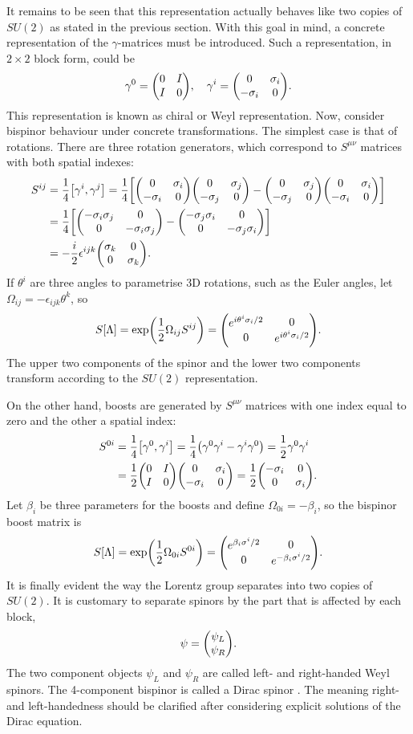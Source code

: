 It remains to be seen that this representation actually behaves like two copies of $SU(2)$ as stated in the previous section. With this goal in mind, a concrete representation of the $\gamma$-matrices must be introduced. Such a representation, in $2\times 2$ block form, could be
$$\gamma^0 = \mqty(\admat[0]{I,I}), \quad \gamma^{i} = \mqty(\admat[0]{\sigma_i,-\sigma_i}).$$ This representation is known as chiral or Weyl representation. Now, consider bispinor behaviour under concrete transformations. The simplest case is that of rotations. There are three rotation generators, which correspond to $S^{\mu\nu}$ matrices with both spatial indexes:
\begin{align*}
    S^{ij} &= \frac{1}{4}\comm{\gamma^{i}}{\gamma^{j}} = \frac{1}{4}\qty[\mqty(\admat[0]{\sigma_{i},-\sigma_i})\mqty(\admat[0]{\sigma_{j},-\sigma_j})-\mqty(\admat[0]{\sigma_{j},-\sigma_j})\mqty(\admat[0]{\sigma_{i},-\sigma_i})]\\
    &= \frac{1}{4}\qty[\mqty(\dmat[0]{-\sigma_i\sigma_j, -\sigma_i\sigma_j})-\mqty(\dmat[0]{-\sigma_j\sigma_i, -\sigma_j\sigma_i})] \\
    &= -\frac{i}{2}\epsilon^{ijk}\mqty(\dmat[0]{\sigma_k,\sigma_k}).
\end{align*}
If $\theta^i$ are three angles to parametrise 3D rotations, such as the Euler angles, let $\Omega_{ij} = -\epsilon_{ijk}\theta^{k}$, so $$S[\Lambda] = \exp(\frac{1}{2}\Omega_{ij}S^{ij}) = \mqty(\dmat[0]{e^{i\theta^i \sigma_i/2},e^{i\theta^i \sigma_i/2}}).$$ The upper two components of the spinor and the lower two components transform according to the $SU(2)$ representation.

On the other hand, boosts are generated by $S^{\mu\nu}$ matrices with one index equal to zero and the other a spatial index:
\begin{align*}
    S^{0i} &= \frac{1}{4}\comm{\gamma^{0}}{\gamma^{i}} = \frac{1}{4}\qty(\gamma^0\gamma^i-\gamma^i\gamma^0) = \frac{1}{2}\gamma^0\gamma^i\\
    &=\frac{1}{2}\mqty(\admat[0]{I,I})\mqty(\admat[0]{\sigma_{i},-\sigma_i}) = \frac{1}{2}\mqty(\dmat[0]{-\sigma_i,\sigma_i}).
\end{align*}
Let $\beta_i$ be three parameters for the boosts and define $\Omega_{0i} = -\beta_i$, so the bispinor boost matrix is $$ S[\Lambda] = \exp(\frac{1}{2}\Omega_{0i}S^{0i}) = \mqty(\dmat[0]{e^{\beta_i\sigma^i/2},e^{-\beta_i\sigma^i/2}}).$$
It is finally evident the way the Lorentz group separates into two copies of $SU(2)$. It is customary to separate spinors by the part that is affected by each block, $$ \psi = \mqty( \psi_L \\ \psi_R).$$ The two component objects $\psi_L$ and $\psi_R$ are called left- and right-handed Weyl spinors. The 4-component bispinor is called a Dirac spinor \cite{peskin_introduction_1995}. The meaning right- and left-handedness should be clarified after considering explicit solutions of the Dirac equation.


